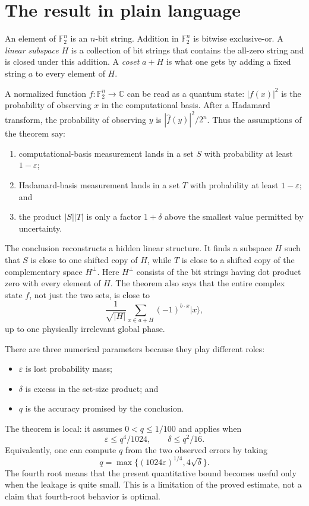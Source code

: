 \documentclass[11pt]{article}
\theoremstyle{remark}
\newcommand{\F}{\mathbb F}
\newcommand{\C}{\mathbb C}
\newcommand{\1}{\mathbf 1}
\begin{document}
\section{The result in plain language}\label{sec:plain}

An element of $\F_2^n$ is an $n$-bit string. Addition in $\F_2^n$ is bitwise
exclusive-or. A \emph{linear subspace} $H$ is a collection of bit strings
that contains the all-zero string and is closed under this addition. A
\emph{coset} $a+H$ is what one gets by adding a fixed string $a$ to every
element of $H$.

A normalized function $f:\F_2^n\to\C$ can be read as a quantum state:
$|f(x)|^2$ is the probability of observing $x$ in the computational basis.
After a Hadamard transform, the probability of observing $y$ is
$|\widehat f(y)|^2/2^n$. Thus the assumptions of the theorem say:
\begin{enumerate}
  \item computational-basis measurement lands in a set $S$ with probability
  at least $1-\varepsilon$;
  \item Hadamard-basis measurement lands in a set $T$ with probability at
  least $1-\varepsilon$; and
  \item the product $|S||T|$ is only a factor $1+\delta$ above the smallest
  value permitted by uncertainty.
\end{enumerate}

The conclusion reconstructs a hidden linear structure. It finds a subspace
$H$ such that $S$ is close to one shifted copy of $H$, while $T$ is close to
a shifted copy of the complementary space $H^\perp$. Here $H^\perp$ consists
of the bit strings having dot product zero with every element of $H$.
The theorem also says that the entire complex state $f$, not just the two
sets, is close to
\[
  \frac{1}{\sqrt{|H|}}
  \sum_{x\in a+H}(-1)^{b\cdot x}|x\rangle,
\]
up to one physically irrelevant global phase.

There are three numerical parameters because they play different roles:
\begin{itemize}
  \item $\varepsilon$ is lost probability mass;
  \item $\delta$ is excess in the set-size product; and
  \item $q$ is the accuracy promised by the conclusion.
\end{itemize}
The theorem is local: it assumes $0<q\leq1/100$ and applies when
\[
  \varepsilon\leq q^4/1024,\qquad \delta\leq q^2/16.
\]
Equivalently, one can compute $q$ from the two observed errors by taking
\[
  q=\max\{(1024\varepsilon)^{1/4},4\sqrt{\delta}\}.
\]
The fourth root means that the present quantitative bound becomes useful
only when the leakage is quite small. This is a limitation of the proved
estimate, not a claim that fourth-root behavior is optimal.
\end{document}

